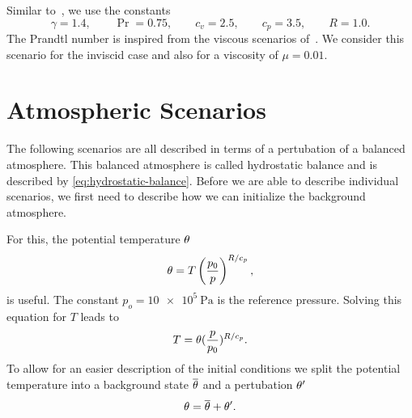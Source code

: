 Similar to~\cite{helzel2000modified}, we use the constants
\begin{equation}
  \gamma = 1.4 ,\qquad \Pr = 0.75, \qquad c_v = 2.5 ,\qquad c_p = 3.5 ,\qquad R = 1.0.
\end{equation}
The Prandtl number is inspired from the viscous scenarios of~\cite{hidalgo2011ader}.
We consider this scenario for the inviscid case and also for a viscosity of $\mu = 0.01$.

\section{Atmospheric Scenarios}
The following scenarios are all described in terms of a pertubation of a balanced atmosphere.
This balanced atmosphere is called hydrostatic balance and is described by \cref{eq:hydrostatic-balance}.
Before we are able to describe individual scenarios, we first need to describe how we can initialize the background atmosphere.

For this, the potential temperature $\theta$
\begin{equation}
  \theta = T \left( \frac{p_0}{p} \right)^{R/c_p},
\end{equation}
is useful.
The constant $p_o = \SI{10e5}{\Pa}$ is the reference pressure.
Solving this equation for $T$ leads to
\begin{equation}
  \label{eq:potTToT}
  T = \theta (\frac{p}{p_0})^{R/c_p}.
\end{equation}
To allow for an easier description of the initial conditions we split the potential temperature into a background state $\overline{\theta}$ and a pertubation $\theta'$
\begin{equation}
  \label{eq:potT-split}
  \theta = \overline{\theta} + \theta'.
\end{equation}

